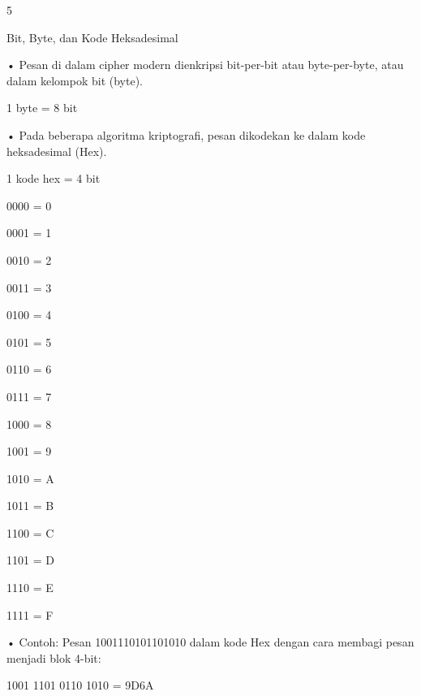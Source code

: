 \documentclass{article}
\begin{document}

5

Bit, Byte, dan Kode Heksadesimal 

• Pesan di dalam cipher modern dienkripsi bit-per-bit atau byte-per-byte, atau dalam kelompok bit (byte). 


1 byte = 8 bit

• Pada beberapa algoritma kriptografi, pesan dikodekan ke dalam kode heksadesimal (Hex). 


1 kode hex = 4 bit


0000 = 0  

0001 = 1  

0010 = 2  

0011 = 3


0100 = 4  

0101 = 5  

0110 = 6  

0111 = 7


1000 = 8  

1001 = 9  

1010 = A 

1011 = B


1100 = C  

1101 = D 

1110 = E  

1111 = F

• Contoh: Pesan 1001110101101010 dalam kode Hex dengan  cara membagi pesan menjadi blok 4-bit: 


1001  1101  0110  1010 = 9D6A
\end{document}
